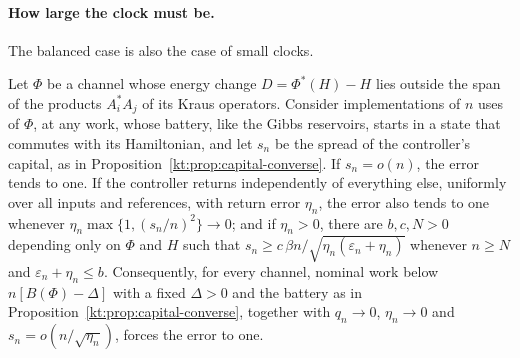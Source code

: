 \paragraph{How large the clock must be.} The balanced case is also the case of small clocks.

\begin{proposition}\label{kt:prop:broadclock}
Let $\Phi$ be a channel whose energy change $D=\Phi^*(H)-H$ lies outside the span of the products $A_i^*A_j$ of its Kraus operators. Consider implementations of $n$ uses of $\Phi$, at any work, whose battery, like the Gibbs reservoirs, starts in a state that commutes with its Hamiltonian, and let $s_n$ be the spread of the controller's capital, as in Proposition~\ref{kt:prop:capital-converse}. If $s_n=o(n)$, the error tends to one. If the controller returns independently of everything else, uniformly over all inputs and references, with return error $\eta_n$, the error also tends to one whenever $\eta_n\max\{1,(s_n/n)^2\}\to0$; and if $\eta_n>0$, there are $b,c,N>0$ depending only on $\Phi$ and $H$ such that $s_n\ge c\,\beta n/\sqrt{\eta_n(\varepsilon_n+\eta_n)}$ whenever $n\ge N$ and $\varepsilon_n+\eta_n\le b$. Consequently, for every channel, nominal work below $n[B(\Phi)-\Delta]$ with a fixed $\Delta>0$ and the battery as in Proposition~\ref{kt:prop:capital-converse}, together with $q_n\to0$, $\eta_n\to0$ and $s_n=o(n/\sqrt{\eta_n})$, forces the error to one.
\end{proposition}

